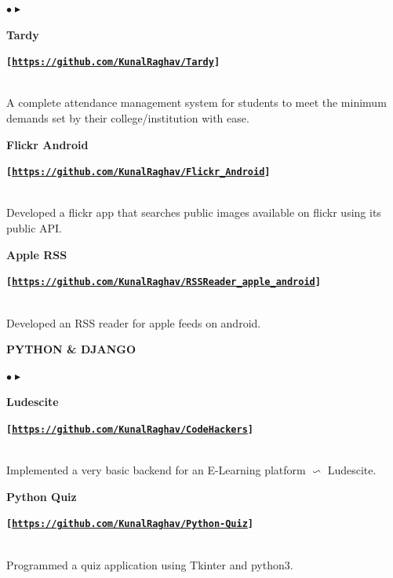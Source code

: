 \documentclass[8pt,a4paper]{extarticle}
\begin{document}
\begin{minipage}{0.65\textwidth}
\begin{list}{{\color{resumeBlueLight}$\bullet\blacktriangleright$}}{}
		\item {\color{resumeBlueDark}\textbf{Tardy}}\hfill
			\begin{tiny}
				{\color{gray}
				\textbf{\texttt{[\url{https://github.com/KunalRaghav/Tardy}]}}
				}
			\end{tiny}\\
		A complete attendance management system for students to meet the minimum 
		demands set by their college/institution with ease.
		\item {\color{resumeBlueDark}\textbf{Flickr Android}}\hfill 
			\begin{tiny}
				{\color{gray}
				\textbf{\texttt{[\url{https://github.com/KunalRaghav/Flickr_Android}]}}
				}
			\end{tiny} \\ 
		Developed a flickr app that searches public images available on flickr using its public API.
		\item {\color{resumeBlueDark}\textbf{Apple RSS}}\hfill 
			\begin{tiny}
				{\color{gray}
				\textbf{\texttt{[\url{https://github.com/KunalRaghav/RSSReader_apple_android}]}}
				}
			\end{tiny} \\ 
		Developed an RSS reader for apple feeds on android.
	\end{list}
	{\color{resumeGreenLight}\textbf{PYTHON \& DJANGO}}
	\begin{list}{{\color{resumeBlueLight}$\bullet\blacktriangleright$}}{}
		\item {\color{resumeBlueDark}\textbf{Ludescite}}\hfill 
			\begin{tiny}
				{\color{gray}
				\textbf{\texttt{[\url{https://github.com/KunalRaghav/CodeHackers}]}}
				}
			\end{tiny} \\ 
		Implemented a very basic backend for an E-Learning platform $\backsim$ Ludescite.
		\item {\color{resumeBlueDark}\textbf{Python Quiz}}\hfill 
			\begin{tiny}
				{\color{gray}
				\textbf{\texttt{[\url{https://github.com/KunalRaghav/Python-Quiz}]}}
				}
			\end{tiny} \\ 
		Programmed a quiz application using Tkinter and python3.
	\end{list}
	{\color{resumeGreenSea}
}
\end{minipage}
\end{document}
